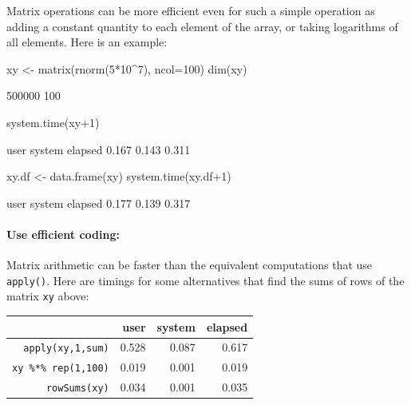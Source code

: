 \documentclass{tufte-book}\usepackage[]{graphicx}\usepackage[]{color}
\newcommand{\txtt}[1]{\texttt{#1}}
\begin{document}
Matrix operations can be more efficient even for such a simple
operation as adding a constant quantity to each element of the array,
or taking logarithms of all elements.  Here is an
example:
\begin{Schunk}
\begin{Sinput}
xy <- matrix(rnorm(5*10^7), ncol=100)
dim(xy)
\end{Sinput}
\begin{Soutput}
[1] 500000    100
\end{Soutput}
\end{Schunk}
\begin{Schunk}
\begin{Sinput}
system.time(xy+1)
\end{Sinput}
\begin{Soutput}
   user  system elapsed 
  0.167   0.143   0.311 
\end{Soutput}
\begin{Sinput}
xy.df <- data.frame(xy)
system.time(xy.df+1)
\end{Sinput}
\begin{Soutput}
   user  system elapsed 
  0.177   0.139   0.317 
\end{Soutput}
\end{Schunk}
\vspace*{-12pt}

\paragraph{Use efficient coding:}
Matrix arithmetic can be faster than the equivalent computations
that use \txtt{apply()}. Here are timings for some alternatives that
find the sums of rows of the matrix \txtt{xy} above:\\[-4pt]

\begin{center}
\begin{tabular}{rrrr}
  \hline
 & user & system & elapsed \\
  \hline
\txtt{apply(xy,1,sum)}      & 0.528 & 0.087 & 0.617 \\
 \txtt{xy \%*\% rep(1,100)} & 0.019 & 0.001 & 0.019 \\
 \txtt{rowSums(xy)}         & 0.034 & 0.001 & 0.035 \\
   \hline
\end{tabular}
\end{center}
\vspace*{-9pt}
\end{document}
